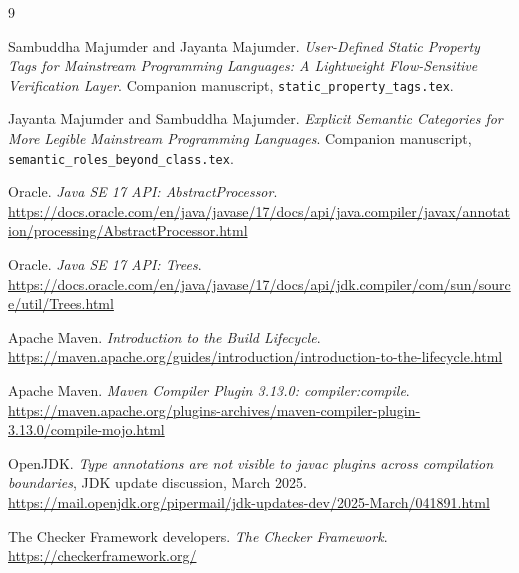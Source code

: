 \documentclass[11pt]{article}
\begin{document}
\begin{thebibliography}{9}
\raggedright
{}
Sambuddha Majumder and Jayanta Majumder.
\emph{User-Defined Static Property Tags for Mainstream Programming Languages:
A Lightweight Flow-Sensitive Verification Layer}.
Companion manuscript, \texttt{static\_property\_tags.tex}.

Jayanta Majumder and Sambuddha Majumder.
\emph{Explicit Semantic Categories for More Legible Mainstream Programming Languages}.
Companion manuscript, \texttt{semantic\_roles\_beyond\_class.tex}.

Oracle. \emph{Java SE 17 API: AbstractProcessor}.
\url{https://docs.oracle.com/en/java/javase/17/docs/api/java.compiler/javax/annotation/processing/AbstractProcessor.html}

Oracle. \emph{Java SE 17 API: Trees}.
\url{https://docs.oracle.com/en/java/javase/17/docs/api/jdk.compiler/com/sun/source/util/Trees.html}

Apache Maven. \emph{Introduction to the Build Lifecycle}.
\url{https://maven.apache.org/guides/introduction/introduction-to-the-lifecycle.html}

Apache Maven. \emph{Maven Compiler Plugin 3.13.0: compiler:compile}.
\url{https://maven.apache.org/plugins-archives/maven-compiler-plugin-3.13.0/compile-mojo.html}

OpenJDK. \emph{Type annotations are not visible to javac plugins across
compilation boundaries}, JDK update discussion, March 2025.
\url{https://mail.openjdk.org/pipermail/jdk-updates-dev/2025-March/041891.html}

The Checker Framework developers. \emph{The Checker Framework}.
\url{https://checkerframework.org/}
\end{thebibliography}
\end{document}
